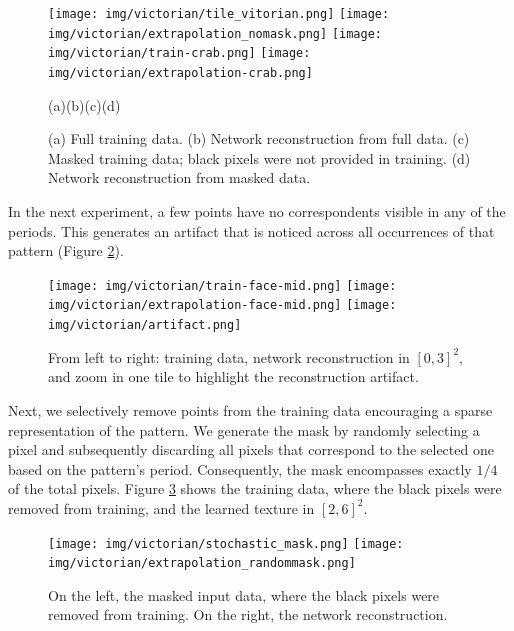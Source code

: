 \begin{figure}[!h]
\centering
\texttt{[image: img/victorian/tile\_vitorian.png]}
\texttt{[image: img/victorian/extrapolation\_nomask.png]}
\texttt{[image: img/victorian/train-crab.png]}
\texttt{[image: img/victorian/extrapolation-crab.png]}
\vspace{-0.2cm}
\centerline{(a)\hfil\hfil(b)\hfil\hfil(c)\hfil\hfil(d)}
\vspace{-0.4cm}
\caption{(a) Full training data. (b) Network reconstruction from full data. (c) Masked training data; black pixels were not provided in training. (d) Network reconstruction from masked data.}
\label{f:mask_nomask}
\end{figure}

In the next experiment, a few points have no correspondents visible in any of the periods. This generates an artifact that is noticed across all occurrences of that pattern (Figure \ref{f:artifact}).

\begin{figure}[!h]
\centering
\texttt{[image: img/victorian/train-face-mid.png]}
\texttt{[image: img/victorian/extrapolation-face-mid.png]}
\texttt{[image: img/victorian/artifact.png]}
\vspace{-0.4cm}
\caption{From left to right: training data, network reconstruction in $[0, 3]^2$, and zoom in one tile to highlight the reconstruction artifact.}
\label{f:artifact}
\end{figure}


Next, we selectively remove points from the training data encouraging a sparse representation of the pattern. We generate the mask by randomly selecting a pixel and subsequently discarding all pixels that correspond to the selected one based on the pattern's period. 
Consequently, the mask encompasses exactly $1/4$ of the total pixels. Figure \ref{f:masked_recontruction} shows the training data, where the black pixels were removed from training, and the learned texture in $[2, 6]^2$. 
\begin{figure}[!h]
\centering
\texttt{[image: img/victorian/stochastic\_mask.png]}
\texttt{[image: img/victorian/extrapolation\_randommask.png]}
\vspace{-0.4cm}
\caption{On the left, the masked input data, where the black pixels were removed from training. On the right, the network reconstruction.~\\
}
\label{f:masked_recontruction}
\end{figure}

